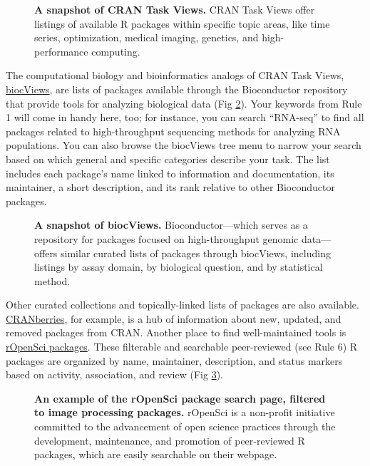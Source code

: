 \documentclass[10pt,letterpaper]{article}
\begin{document}
\begin{figure}[!h]
\caption{{\bf A snapshot of CRAN Task Views.}
CRAN Task Views offer listings of available R packages within specific
topic areas, like time series, optimization, medical imaging, genetics, 
and high-performance computing.}
\label{fig1}
\end{figure}

The computational biology and bioinformatics analogs of CRAN Task Views,
\href{https://www.bioconductor.org/packages/release/BiocViews.html\#___Software}{biocViews},
are lists of packages available through the Bioconductor repository that
provide tools for analyzing biological data (Fig \ref{fig2}). Your
keywords from Rule 1 will come in handy here, too; for instance, you can
search ``RNA-seq'' to find all packages related to high-throughput
sequencing methods for analyzing RNA populations. You can also browse
the biocViews tree menu to narrow your search based on which general and
specific categories describe your task. The list includes each package's
name linked to information and documentation, its maintainer, a short
description, and its rank relative to other Bioconductor packages.

\begin{figure}[!h]
\caption{{\bf A snapshot of biocViews.}
Bioconductor---which serves as a repository for packages focused on
high-throughput genomic data---offers similar curated lists of packages through
biocViews, including listings by assay domain, by biological question, and by
statistical method.}
\label{fig2}
\end{figure}

Other curated collections and topically-linked lists of packages are
also available.
\href{http://dirk.eddelbuettel.com/cranberries/index.html}{CRANberries},
for example, is a hub of information about new, updated, and removed
packages from CRAN. Another place to find well-maintained tools is
\href{https://ropensci.org/packages/}{rOpenSci packages}. These
filterable and searchable peer-reviewed (see Rule 6) R packages are
organized by name, maintainer, description, and status markers based on
activity, association, and review (Fig \ref{fig3}).

\begin{figure}[!h]
\caption{{\bf An example of the rOpenSci package search page, filtered to image processing packages.}
rOpenSci is a non-profit initiative committed to the advancement of open science practices through the development, maintenance, and promotion of peer-reviewed R packages, which are easily searchable on their webpage.}
\label{fig3}
\end{figure}
\end{document}
